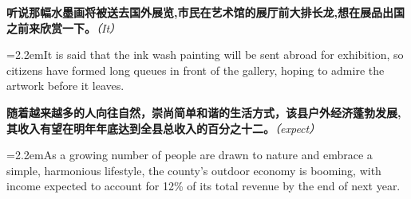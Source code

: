 \documentclass[11pt,a4paper]{article}
\newcommand{\num}[1]{\makebox[1.9em][r]{#1.}\hspace{0.3em}}
\newcommand{\prompt}[1]{\emph{\textcolor{tipblue}{\small（#1）}}}
\begin{document}
\begin{minipage}{\linewidth}

\num{7}\textbf{听说那幅水墨画将被送去国外展览,市民在艺术馆的展厅前大排长龙,想在展品出国之前来欣赏一下。}\prompt{It}

\vspace{0.15em}

\noindent\hangindent=2.2em\hspace{2.2em}It is said that the ink wash painting will be sent abroad for exhibition, so citizens have formed long queues in front of the gallery, hoping to admire the artwork before it leaves.

\end{minipage}

\begin{minipage}{\linewidth}

\num{8}\textbf{随着越来越多的人向往自然，崇尚简单和谐的生活方式，该县户外经济蓬勃发展,其收入有望在明年年底达到全县总收入的百分之十二。}\prompt{expect}

\vspace{0.15em}

\noindent\hangindent=2.2em\hspace{2.2em}As a growing number of people are drawn to nature and embrace a simple, harmonious lifestyle, the county’s outdoor economy is booming, with income expected to account for 12\% of its total revenue by the end of next year.

\end{minipage}
\end{document}
